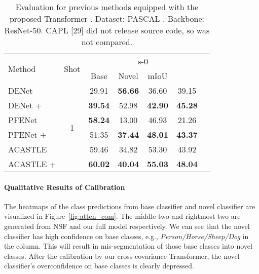 \documentclass[journal]{IEEEtran}
\begin{document}
\begin{table}[ht]
    \centering
    \caption{Evaluation for previous methods equipped with the proposed Transformer . Dataset: PASCAL-. Backbone: ResNet-50. CAPL [29] did not release source code, so was not compared.}
\begin{tabular}{l|c|ccccc}
    \hline
         \multirow{2}{*}{Method} & \multirow{2}{*}{Shot} & \multicolumn{4}{c}{s-0} \\
         \cline{3-6}
          & & Base & Novel & mIoU &  \\
         \hline
         DENet & \multirow{6}{*}{1} & 29.91 & \textbf{56.66} & 36.60 & 39.15  \\
         DENet +  & & \textbf{39.54} & 52.98 & \textbf{42.90} & \textbf{45.28}  \\
         \cline{3-6}
         PFENet & & \textbf{58.24} & 13.00 & 46.93 & 21.26 \\
         PFENet +  & & 51.35 & \textbf{37.44} & \textbf{48.01} & \textbf{43.37} \\
         \cline{3-6}
         ACASTLE & & 59.46 & 34.82 & 53.30 & 43.92 \\
         ACASTLE +  & & \textbf{60.02} & \textbf{40.04} & \textbf{55.03} & \textbf{48.04}  \\
    \hline
    \end{tabular}
    \label{tab:previous}
\end{table}

\paragraph{Qualitative Results of Calibration}
The heatmaps of the class predictions from base classifier and novel classifier are visualized in Figure~\ref{fig:atten_com}. The middle two and rightmost two are generated from NSF and our full model respectively.
We can see that the novel classifier has high confidence on base classes, e.g., \textit{Person/Horse/Sheep/Dog} in the  column. 
This will result in mis-segmentation of those base classes into novel classes.
After the calibration by our cross-covariance Transformer, the novel classifier's overconfidence on base classes is clearly depressed.
\end{document}
